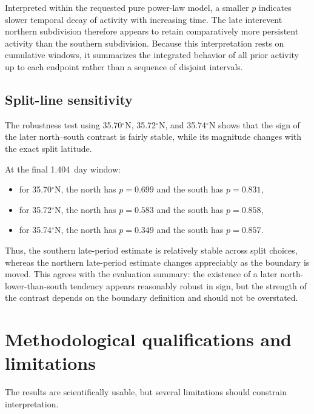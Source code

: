 \documentclass[11pt]{article}
\begin{document}
Interpreted within the requested pure power-law model, a smaller $p$ indicates slower temporal decay of activity with increasing time. The late interevent northern subdivision therefore appears to retain comparatively more persistent activity than the southern subdivision. Because this interpretation rests on cumulative windows, it summarizes the integrated behavior of all prior activity up to each endpoint rather than a sequence of disjoint intervals.

\subsection{Split-line sensitivity}
The robustness test using 35.70$^{\circ}$N, 35.72$^{\circ}$N, and 35.74$^{\circ}$N shows that the sign of the later north--south contrast is fairly stable, while its magnitude changes with the exact split latitude.

At the final 1.404~day window:
\begin{itemize}[leftmargin=2em]
    \item for 35.70$^{\circ}$N, the north has $p=0.699$ and the south has $p=0.831$,
    \item for 35.72$^{\circ}$N, the north has $p=0.583$ and the south has $p=0.858$,
    \item for 35.74$^{\circ}$N, the north has $p=0.349$ and the south has $p=0.857$.
\end{itemize}
Thus, the southern late-period estimate is relatively stable across split choices, whereas the northern late-period estimate changes appreciably as the boundary is moved. This agrees with the evaluation summary: the existence of a later north-lower-than-south tendency appears reasonably robust in sign, but the strength of the contrast depends on the boundary definition and should not be overstated.

\section{Methodological qualifications and limitations}
The results are scientifically usable, but several limitations should constrain interpretation.
\end{document}

